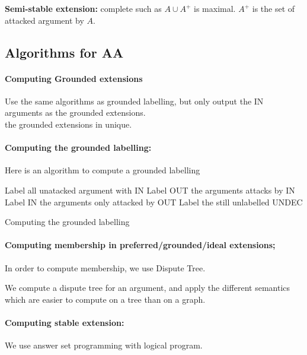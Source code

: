 		\begin{definition}
			\textbf{Semi-stable extension:} complete such as $A\cup A^+$ is maximal. $A^+$ is the set of attacked argument by $A$.
		\end{definition}


	\subsection{Algorithms for AA}

		\paragraph*{Computing Grounded extensions}
		Use the same algorithms as grounded labelling, but only output the IN arguments as the grounded extensions.\\
		the grounded extensions in unique. 

		\paragraph{Computing the grounded labelling:}
		Here is an algorithm to compute a grounded labelling\\

		\begin{algorithm}[H]
		Label all unatacked argument with IN \;
		{
			Label OUT the arguments attacks by IN \;
			Label IN the arguments only attacked by OUT\;
		}
		Label the still unlabelled UNDEC\;
		\caption{Computing the grounded labelling}
		\end{algorithm}

		\paragraph{Computing membership in preferred/grounded/ideal extensions;} In order to compute membership, we use Dispute Tree.

		We compute a dispute tree for an argument, and apply the different semantics which are easier to compute on a tree than on a graph.

		\paragraph{Computing stable extension:} We use answer set programming with logical program. 
		

